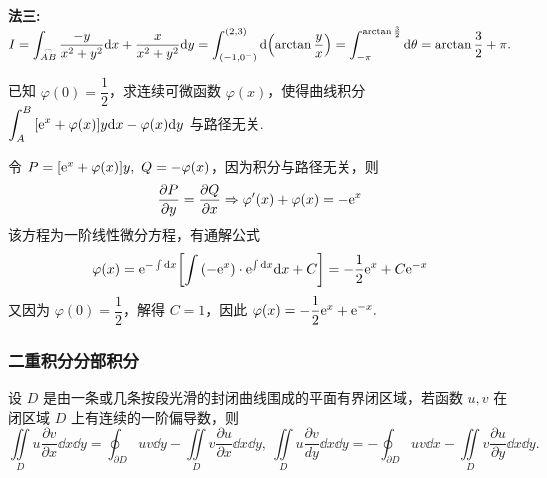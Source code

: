 \begin{solution}
\begin{minipage}{0.35\linewidth}
\begin{figure}[H]
            \caption{}
        \end{figure}
    \end{minipage}
    \textbf{法三: }$\displaystyle I=\int_{\stackrel\frown{AB}}\dfrac{-y}{x^2+y^2}\dd x+\dfrac{x}{x^2+y^2}\dd y=\int_{(-1,0^-)}^{(2,3)}\dd \qty(\arctan\dfrac{y}{x})=\int_{-\pi}^{\arctan\frac{3}{2}}\dd \theta=\arctan\dfrac{3}{2}+\pi.$\\
\end{solution}

\begin{example}
    已知 $\varphi(0)=\dfrac{1}{2}$，求连续可微函数 $\varphi(x)$，使得曲线积分 $\displaystyle\int_{A}^{B}\qty[\mathrm{e}^x+\varphi(x)]y\dd x-\varphi(x)\dd y$ 与路径无关.
\end{example}
\begin{solution}
    令 $P=\qty[\mathrm{e}^x+\varphi(x)]y,~Q=-\varphi(x)$，因为积分与路径无关，则 $$\pdv{P}{y}=\pdv{Q}{x}\Rightarrow \varphi'(x)+\varphi(x)=-\mathrm{e}^x$$
    该方程为一阶线性微分方程，有通解公式 $$\varphi(x)=\mathrm{e}^{-\int\dd x}\qty[\int\qty(-\mathrm{e}^{x})\cdot\mathrm{e}^{\int\dd x}\dd x+C]=-\dfrac{1}{2}\mathrm{e}^{x}+C\mathrm{e}^{-x}$$
    又因为 $\varphi(0)=\dfrac{1}{2}$，解得 $C=1$，因此 $\varphi(x)=-\dfrac{1}{2}\mathrm{e}^x+\mathrm{e}^{-x}.$
\end{solution}

\subsubsection{二重积分分部积分}

\begin{theorem}[二重积分分部积分公式]
    设 $D$ 是由一条或几条按段光滑的封闭曲线围成的平面有界闭区域，若函数  $u,v$ 在闭区域 $D$ 上有连续的一阶偏导数，则
    \label{iintlimitsduvxxy}
    $$\iint\limits _{D}u\dfrac{\partial v}{\partial x}\dd x\dd y=\oint _{\partial D}uv\dd y-\iint\limits _{D}v\dfrac{\partial u}{\partial x}\dd x\dd y,~\iint\limits _{D}u\dfrac{\partial v}{dy}\dd x\dd y=-\oint _{\partial D}uv\dd x-\iint\limits _{D}v\dfrac{\partial u}{\partial y}\dd x\dd y.$$
\end{theorem}

